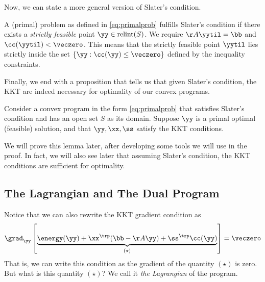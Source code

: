 Now, we can state a more general version of Slater's condition.

\begin{definition} \label{def:slatergeneral}
A (primal) problem as defined in \eqref{eq:primalprob} fulfills
Slater's condition if there exists a \emph{strictly feasible} point
$\yy \in \operatorname{relint}(S)$.
We require $\AA\yytil = \bb$ and $\cc(\yytil) <
\veczero$.
This means that the strictly feasible point $\yytil$ lies strictly inside the set $\{\yy : \cc(\yy) \leq \veczero\}$ defined by the inequality constraints.
\end{definition}

Finally, we end with a proposition that tells us that given Slater's
condition, the KKT are indeed necessary for optimality of our convex programs.

\begin{proposition}
  \label{pro:KKTnecessary}
  Consider a convex program in the form \eqref{eq:primalprob} that
  satisfies Slater's condition and has an open set $S$ as its domain.
  Suppose $\yy$ is a primal optimal (feasible) solution, and that
  $\yy, \xx, \ss$ satisfy the KKT conditions.
\end{proposition}

We will prove this lemma later, after developing some tools we will
use in the proof.
In fact, we will also see later that assuming Slater's condition, the KKT
conditions are sufficient for optimality.

\subsection{The Lagrangian and The Dual Program}

Notice that we can also rewrite the KKT gradient condition as
\[
  \grad_{\yy}
  \left[ \underbrace{\energy(\yy) + \xx^{\trp}(\bb-\AA\yy) +
      \ss^{\trp}\cc(\yy)
    }_{(\star)}
    \right]
= \veczero
  \]
That is, we can write this condition as the gradient of the quantity
$(\star)$ is zero.
But what is this quantity $(\star)$?
We call it \emph{the Lagrangian} of the program.

